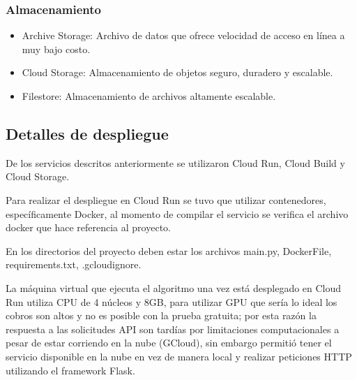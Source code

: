 \documentclass[../Main.tex]{subfiles}
\begin{document}
    \subsubsection{Almacenamiento}
    \begin{itemize}
        \item Archive Storage: Archivo de datos que ofrece velocidad de acceso en línea a muy bajo costo.
        \item Cloud Storage: Almacenamiento de objetos seguro, duradero y escalable.
        \item Filestore: Almacenamiento de archivos altamente escalable.
    \end{itemize}
    
    \subsection{Detalles de despliegue}
    \begin{justify}
    De los servicios descritos anteriormente se utilizaron Cloud Run, Cloud Build y Cloud Storage.
    
    Para realizar el despliegue en Cloud Run se tuvo que utilizar contenedores, específicamente Docker, al momento de compilar el servicio se verifica el archivo docker que hace referencia al proyecto.
    
    En los directorios del proyecto deben estar los archivos main.py, DockerFile, requirements.txt, .gcloudignore.
    
    La máquina virtual que ejecuta el algoritmo una vez está desplegado en Cloud Run utiliza CPU de 4 núcleos y 8GB, para utilizar GPU que sería lo ideal los cobros son altos y no es posible con la prueba gratuita; por esta razón la respuesta a las solicitudes API son tardías por limitaciones computacionales a pesar de estar corriendo en la nube (GCloud), sin embargo permitió tener el servicio disponible en la nube en vez de manera local y realizar peticiones HTTP utilizando el framework Flask.
    \end{justify}
    
\end{document}
